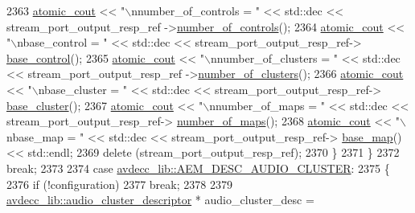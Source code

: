 \begin{DoxyCode}
2363             \hyperlink{cmd__line_8h_a0bc38ccc65c79ba06c6fcd7b4bf554c3}{atomic\_cout} << \textcolor{stringliteral}{"\(\backslash\)nnumber\_of\_controls = "} << std::dec << stream\_port\_output\_resp\_ref
      ->\hyperlink{classavdecc__lib_1_1stream__port__output__descriptor__response_a5accf7abc7d231a0767ad5cac68b8b39}{number\_of\_controls}();
2364             \hyperlink{cmd__line_8h_a0bc38ccc65c79ba06c6fcd7b4bf554c3}{atomic\_cout} << \textcolor{stringliteral}{"\(\backslash\)nbase\_control = "} << std::dec << stream\_port\_output\_resp\_ref->
      \hyperlink{classavdecc__lib_1_1stream__port__output__descriptor__response_ac1f5297533142234c764e84c01ce5a16}{base\_control}();
2365             \hyperlink{cmd__line_8h_a0bc38ccc65c79ba06c6fcd7b4bf554c3}{atomic\_cout} << \textcolor{stringliteral}{"\(\backslash\)nnumber\_of\_clusters = "} << std::dec << stream\_port\_output\_resp\_ref
      ->\hyperlink{classavdecc__lib_1_1stream__port__output__descriptor__response_a2ea8849b4f2d61dd26ed53e94316e93e}{number\_of\_clusters}();
2366             \hyperlink{cmd__line_8h_a0bc38ccc65c79ba06c6fcd7b4bf554c3}{atomic\_cout} << \textcolor{stringliteral}{"\(\backslash\)nbase\_cluster = "} << std::dec << stream\_port\_output\_resp\_ref->
      \hyperlink{classavdecc__lib_1_1stream__port__output__descriptor__response_aa87ccba6a00a404146e569e70185d839}{base\_cluster}();
2367             \hyperlink{cmd__line_8h_a0bc38ccc65c79ba06c6fcd7b4bf554c3}{atomic\_cout} << \textcolor{stringliteral}{"\(\backslash\)nnumber\_of\_maps = "} << std::dec << stream\_port\_output\_resp\_ref->
      \hyperlink{classavdecc__lib_1_1stream__port__output__descriptor__response_acda32e14eb207ebd11856fab5172173c}{number\_of\_maps}();
2368             \hyperlink{cmd__line_8h_a0bc38ccc65c79ba06c6fcd7b4bf554c3}{atomic\_cout} << \textcolor{stringliteral}{"\(\backslash\)nbase\_map = "} << std::dec << stream\_port\_output\_resp\_ref->
      \hyperlink{classavdecc__lib_1_1stream__port__output__descriptor__response_aec19e0ab011108a60ce3e82bc682e5e0}{base\_map}() << std::endl;
2369             \textcolor{keyword}{delete} (stream\_port\_output\_resp\_ref);
2370         \}
2371     \}
2372     \textcolor{keywordflow}{break};
2373 
2374     \textcolor{keywordflow}{case} \hyperlink{namespaceavdecc__lib_ac7b7d227e46bc72b63ee9e9aae15902fa84158b480b7b6ff17f874ab717903428}{avdecc\_lib::AEM\_DESC\_AUDIO\_CLUSTER}:
2375     \{
2376         \textcolor{keywordflow}{if} (!configuration)
2377             \textcolor{keywordflow}{break};
2378 
2379         \hyperlink{classavdecc__lib_1_1audio__cluster__descriptor}{avdecc\_lib::audio\_cluster\_descriptor} * audio\_cluster\_desc = 

\end{DoxyCode}
